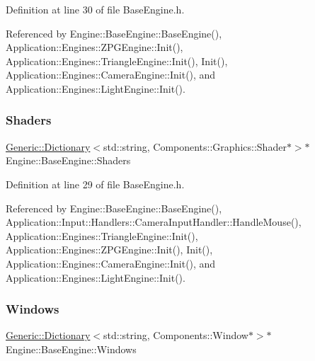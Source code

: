 Definition at line 30 of file Base\+Engine.\+h.



Referenced by Engine\+::\+Base\+Engine\+::\+Base\+Engine(), Application\+::\+Engines\+::\+Z\+P\+G\+Engine\+::\+Init(), Application\+::\+Engines\+::\+Triangle\+Engine\+::\+Init(), Init(), Application\+::\+Engines\+::\+Camera\+Engine\+::\+Init(), and Application\+::\+Engines\+::\+Light\+Engine\+::\+Init().

\mbox{\label{classEngine_1_1BaseEngine_a2582dee3f73da82bb422b43317b85e3b}} 
\subsubsection{\texorpdfstring{Shaders}{Shaders}}
{\footnotesize\ttfamily \mbox{\hyperlink{classGeneric_1_1Dictionary}{Generic\+::\+Dictionary}}$<$std\+::string, Components\+::\+Graphics\+::\+Shader$\ast$$>$$\ast$ Engine\+::\+Base\+Engine\+::\+Shaders\hspace{0.3cm}{\ttfamily [inherited]}}



Definition at line 29 of file Base\+Engine.\+h.



Referenced by Engine\+::\+Base\+Engine\+::\+Base\+Engine(), Application\+::\+Input\+::\+Handlers\+::\+Camera\+Input\+Handler\+::\+Handle\+Mouse(), Application\+::\+Engines\+::\+Triangle\+Engine\+::\+Init(), Application\+::\+Engines\+::\+Z\+P\+G\+Engine\+::\+Init(), Init(), Application\+::\+Engines\+::\+Camera\+Engine\+::\+Init(), and Application\+::\+Engines\+::\+Light\+Engine\+::\+Init().

\mbox{\label{classEngine_1_1BaseEngine_a4a1a4c4dae052e66ecc4f326eeed4d33}} 
\subsubsection{\texorpdfstring{Windows}{Windows}}
{\footnotesize\ttfamily \mbox{\hyperlink{classGeneric_1_1Dictionary}{Generic\+::\+Dictionary}}$<$std\+::string, Components\+::\+Window$\ast$$>$$\ast$ Engine\+::\+Base\+Engine\+::\+Windows\hspace{0.3cm}{\ttfamily [inherited]}}



